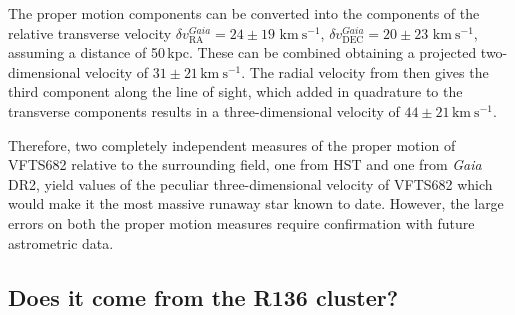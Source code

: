 \documentclass[apjl,twocolumn]{emulateapj}
\newcommand{\kms}{{\,\mathrm{km\ s^{-1}}}}
\newcommand{\masyr}{\,\mathrm{mas}\,\mathrm{yr}^{-1}}
\DeclareRobustCommand{\Eqref}[1]{Eq.~\ref{#1}}
\begin{document}

The proper motion components can be converted into
the components of the relative transverse velocity $\delta v_\mathrm{RA}^{Gaia}=24\pm19\,\kms$,
$\delta v_\mathrm{DEC}^{Gaia}=20\pm23\,\kms$, assuming a distance of
50\,kpc. These can be combined obtaining a projected two-dimensional
velocity of $31\pm21\kms$. %
The radial velocity from
\cite{bestenlehner:11} then gives the third component along
the line of sight, %
which added in quadrature to the transverse components results in a
three-dimensional velocity of $44 \pm 21\kms$.

Therefore, two completely independent measures of the proper motion of
VFTS682 relative to the surrounding field, one from HST and one from
\emph{Gaia} DR2, yield values of the peculiar three-dimensional
velocity of VFTS682 %
which would make it the most massive runaway star
known to date. However, the large errors on both the proper motion measures
require confirmation with future astrometric data. 

\subsection{Does it come from the R136 cluster?}
\label{sec:r136_origin}
\end{document}
